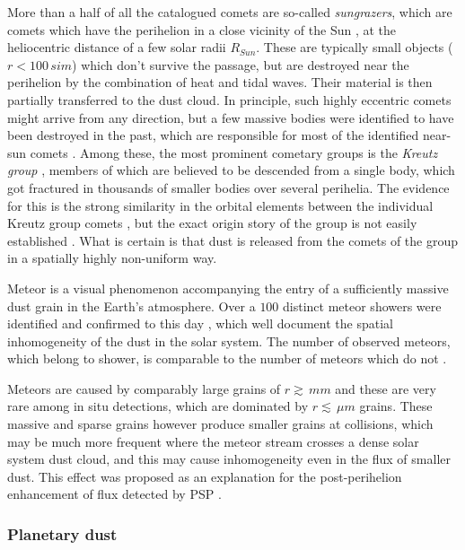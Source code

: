 More than a half of all the catalogued comets are so-called \textit{sungrazers}, which are comets which have the perihelion in a close vicinity of the Sun \citep{jones2018science}, at the heliocentric distance of a few solar radii $R_{Sun}$. These are typically small objects ($r<100 \, si{m}$) which don't survive the passage, but are destroyed near the perihelion by the combination of heat and tidal waves. Their material is then partially transferred to the dust cloud. In principle, such highly eccentric comets might arrive from any direction, but a few massive bodies were identified to have been destroyed in the past, which are responsible for most of the identified near-sun comets \citep{jones2018science}. Among these, the most prominent cometary groups is the \textit{Kreutz group} \citep{kreutz1888untersuchungen}, members of which are believed to be descended from a single body, which got fractured in thousands of smaller bodies over several perihelia. The evidence for this is the strong similarity in the orbital elements between the individual Kreutz group comets \citep{jones2018science}, but the exact origin story of the group is not easily established \citep{kalinicheva2017specific,fernandez2021origin}. What is certain is that dust is released from the comets of the group in a spatially highly non-uniform way. 

Meteor is a visual phenomenon accompanying the entry of a sufficiently massive dust grain in the Earth's atmosphere. Over a $100$ distinct meteor showers were identified and confirmed to this day \citep{jenniskens2020removing}, which well document the spatial inhomogeneity of the dust in the solar system. The number of observed meteors, which belong to shower, is comparable to the number of meteors which do not \citep{jenniskens2016cams}. 

Meteors are caused by comparably large grains of $r \gtrsim \, \si{mm}$ and these are very rare among in situ detections, which are dominated by $r \lesssim \, \si{\mu m}$ grains. These massive and sparse grains however produce smaller grains at collisions, which may be much more frequent where the meteor stream crosses a dense solar system dust cloud, and this may cause inhomogeneity even in the flux of smaller dust. This effect was proposed as an explanation for the post-perihelion enhancement of flux detected by PSP \citep{szalay2021collisional}. 

\subsubsection{Planetary dust}

